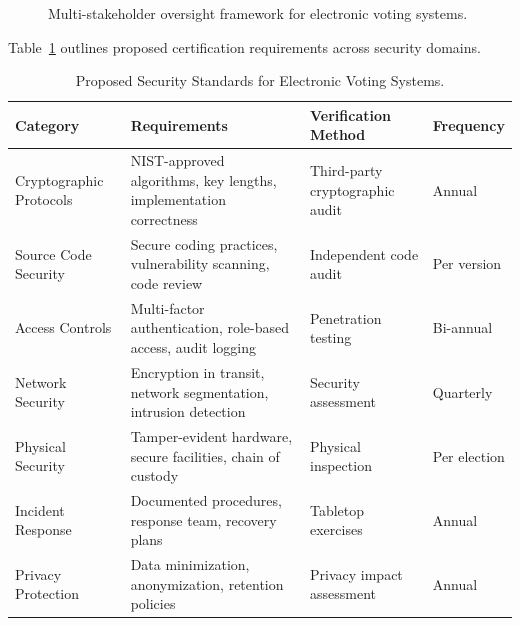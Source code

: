 \documentclass[sigconf,nonacm]{acmart}
\begin{document}
\begin{figure}[h]
\centering
{}
\caption{Multi-stakeholder oversight framework for electronic voting systems.}
\label{fig:oversight}
\end{figure}

\sloppy Table~\ref{tab:standards} outlines proposed certification requirements across security
domains.\fussy

\begin{table}[t]
\caption{Proposed Security Standards for Electronic Voting Systems.}
\label{tab:standards}
\small
\setlength{\tabcolsep}{5pt}
\begin{tabularx}{\textwidth}{@{}p{2.2cm}Xp{2.8cm}p{1.6cm}@{}}
\toprule
\textbf{Category} & \textbf{Requirements} & \textbf{Verification Method} & \textbf{Frequency} \\
\midrule
Cryptographic Protocols & NIST-approved algorithms, key lengths, implementation correctness & Third-party cryptographic audit & Annual \\
Source Code Security    & Secure coding practices, vulnerability scanning, code review    & Independent code audit   & Per version \\
Access Controls         & Multi-factor authentication, role-based access, audit logging  & Penetration testing       & Bi-annual \\
Network Security        & Encryption in transit, network segmentation, intrusion detection & Security assessment    & Quarterly \\
Physical Security       & Tamper-evident hardware, secure facilities, chain of custody   & Physical inspection       & Per election \\
Incident Response       & Documented procedures, response team, recovery plans           & Tabletop exercises        & Annual \\
Privacy Protection      & Data minimization, anonymization, retention policies           & Privacy impact assessment & Annual \\
\bottomrule
\end{tabularx}
\end{table}
\end{document}
